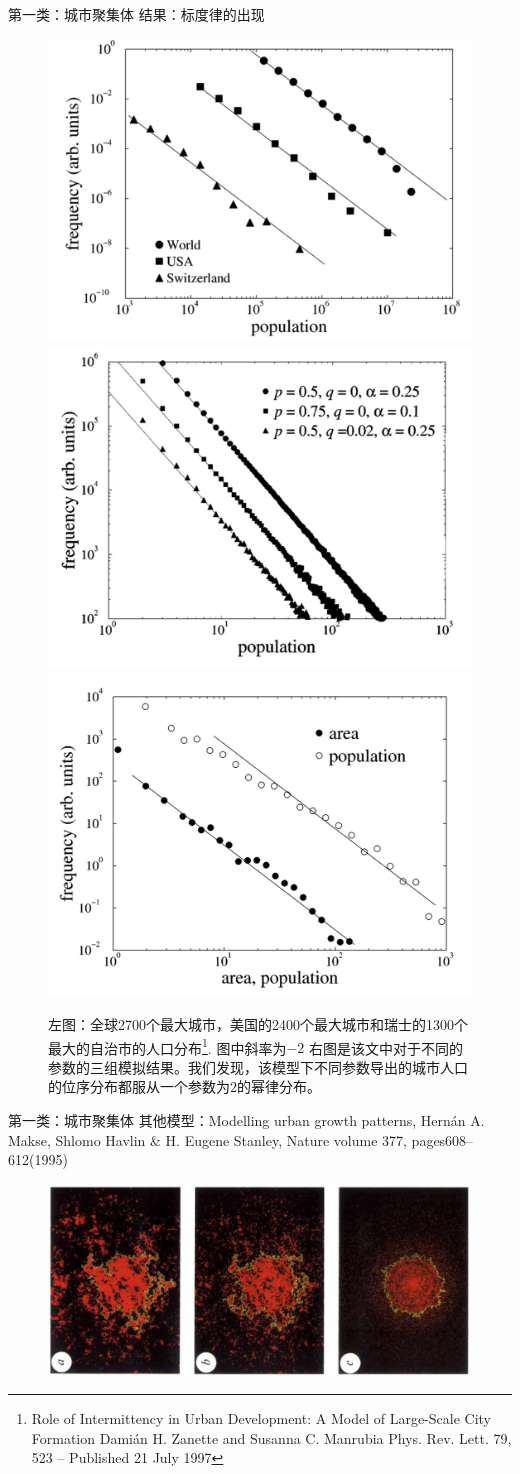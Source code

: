 \documentclass[utf8]{ctexbeamer}
\begin{document}
\begin{frame}{第一类：城市聚集体}
    结果：标度律的出现
    \begin{figure}
        \centering
        \includegraphics[width = 0.3\linewidth]{图片/roiiudreal.png}
        \includegraphics[width = 0.3\linewidth]{图片/roiiud.png}
        \includegraphics[width = 0.3\linewidth]{图片/roiiudarea.png}
        \caption{左图：全球2700个最大城市，美国的2400个最大城市和瑞士的1300个最大的自治市的人口分布\footnote{Role of Intermittency in Urban Development: A Model of Large-Scale City Formation
        Damián H. Zanette and Susanna C. Manrubia
        Phys. Rev. Lett. 79, 523 – Published 21 July 1997}. 图中斜率为$-2$ 右图是该文中对于不同的参数的三组模拟结果。我们发现，该模型下不同参数导出的城市人口的位序分布都服从一个参数为$2$的幂律分布。}
    \end{figure}
\end{frame}

\begin{frame}{第一类：城市聚集体}
    其他模型：Modelling urban growth patterns, Hernán A. Makse, Shlomo Havlin \& H. Eugene Stanley, Nature volume 377, pages608–612(1995)

    \begin{figure}
        \includegraphics[width = 1\linewidth]{图片/modellingurbanpattern.png}
    \end{figure}
\end{frame}
\end{document}

